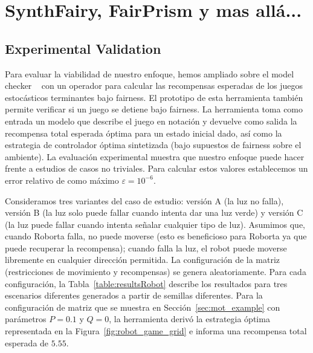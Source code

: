 \chapter{SynthFairy, FairPrism y mas allá...}
\label{cap:fairPrism}

\section{Experimental Validation} \label{sec:experimental_eval}


Para evaluar la viabilidad de nuestro enfoque, hemos ampliado sobre el model checker {\Prism}~\cite{DBLP:conf/cav/KwiatkowskaN0S20,DBLP:conf/cav/KwiatkowskaNP11} con un operador para calcular las recompensas esperadas de los juegos estocásticos terminantes bajo fairness. El prototipo de esta herramienta también permite verificar si un juego se detiene bajo fairness.
La herramienta toma como entrada un modelo que describe el juego en notación {\Prism} y devuelve como salida
la recompensa total esperada óptima para un estado inicial dado, así como la estrategia de controlador óptima sintetizada (bajo supuestos de fairness sobre el ambiente).
La evaluación experimental muestra que nuestro enfoque puede hacer frente a estudios de casos no triviales. Para calcular estos valores establecemos un error relativo de como máximo $\varepsilon = 10^{-6}$.



Consideramos tres variantes del caso de estudio: versión A (la luz no falla), versión B (la luz solo puede fallar cuando intenta dar una luz verde) y versión C (la luz puede fallar cuando intenta señalar cualquier tipo de luz).
Asumimos que, cuando Roborta falla, no puede moverse (esto es beneficioso para Roborta ya que puede recuperar la recompensa);
cuando falla la luz, el robot puede moverse libremente en cualquier dirección permitida.
La configuración de la matriz (restricciones de movimiento y recompensas) se genera aleatoriamente. Para cada configuración, la Tabla~\ref{table:resultsRobot} describe los resultados para tres escenarios diferentes generados a partir de semillas diferentes. Para la configuración de matriz que se muestra en Sección~\ref{sec:mot_example} con parámetros $P=0.1$ y $Q=0$, la herramienta derivó la estrategia óptima representada en la Figura~\ref{fig:robot_game_grid} e informa una recompensa total esperada de $5.55$.

